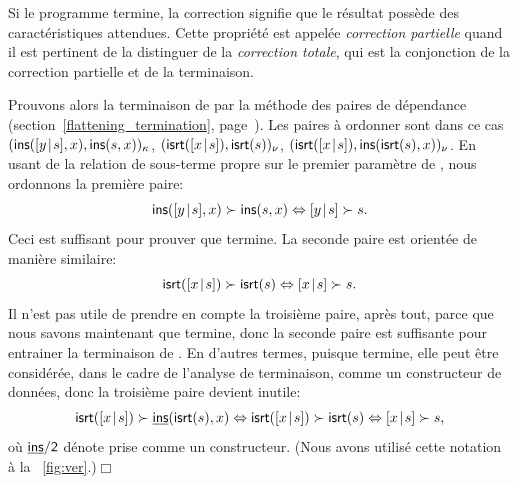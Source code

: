 
Si le programme termine, la correction signifie que le résultat
possède des caractéristiques attendues. Cette propriété est appelée
\emph{correction partielle} quand il est pertinent de la distinguer de
la \emph{correction totale}, qui est la conjonction de la correction
partielle et de la terminaison.

Prouvons alors la terminaison de  par la méthode des
paires de dépendance
(section~\ref{flattening_termination},
page~\pageref{flattening_termination}). Les paires à ordonner sont
dans ce cas \((\textsf{ins}([{y}\!\mid\!{s}],x), \textsf{ins}(s,x))_\kappa\),
\((\textsf{isrt}([{x}\!\mid\!{s}]), \textsf{isrt}(s))_\nu\),
\((\textsf{isrt}([{x}\!\mid\!{s}]), \textsf{ins}(\textsf{isrt}(s), x))_\nu\). En
usant de la relation de sous-terme propre sur le premier paramètre de
, nous ordonnons la première paire:
\begin{equation*}
\textsf{ins}([{y}\!\mid\!{s}],x) \succ \textsf{ins}(s,x) \Leftrightarrow
[{y}\!\mid\!{s}] \succ s.
\end{equation*}
Ceci est suffisant pour prouver que  termine. La seconde
paire est orientée de manière similaire:
\begin{equation*}
\textsf{isrt}([{x}\!\mid\!{s}]) \succ \textsf{isrt}(s) \Leftrightarrow
[{x}\!\mid\!{s}] \succ s.
\end{equation*}
Il n'est pas utile de prendre en compte la troisième paire, après
tout, parce que nous savons maintenant que  termine, donc
la seconde paire est suffisante pour entrainer la terminaison de
. En d'autres termes, puisque
 termine, elle peut être considérée, dans le cadre de
l'analyse de terminaison, comme un constructeur de données, donc la
troisième paire devient inutile:
\begin{equation*}
\textsf{isrt}([{x}\!\mid\!{s}]) \succ \underline{\textsf{ins}}(\textsf{isrt}(s), x)
\Leftrightarrow \textsf{isrt}([{x}\!\mid\!{s}]) \succ \textsf{isrt}(s)
\Leftrightarrow [{x}\!\mid\!{s}] \succ s,
\end{equation*}
où \(\textsf{\underline{\textsf{ins}}/2}\) dénote 
prise comme un constructeur. (Nous avons utilisé cette notation à la
\fig~\vref{fig:ver}.)\hfill\(\Box\)

